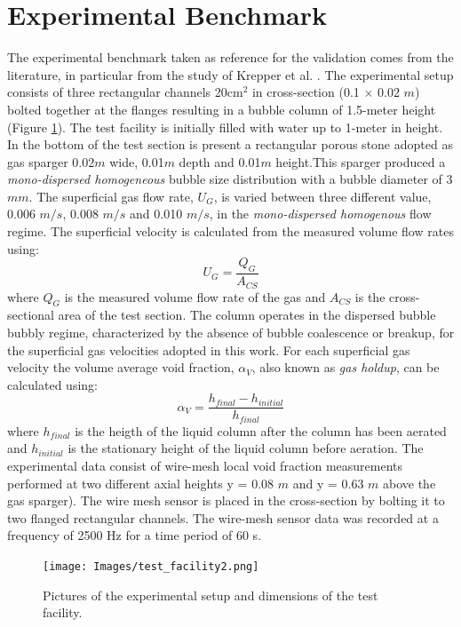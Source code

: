 \documentclass[11pt,a4paper]{article}
\begin{document}
\section{Experimental Benchmark}
\label{sec:expbench}
The  experimental benchmark taken as reference for the validation comes from the literature, in particular from the study of Krepper et al. \cite{krepper}. The experimental setup consists of three rectangular channels 20cm$^2$ in cross-section (0.1 $\times$ 0.02 $m$) bolted together at the flanges resulting in a bubble column of 1.5-meter height (Figure \ref{fig:facility}). The test facility is initially filled with water up to 1-meter in height. In the bottom of the test section is present a rectangular porous stone adopted as gas sparger 0.02$m$ wide, 0.01$m$ depth and 0.01$m$ height.This sparger produced a \textit{mono-dispersed homogeneous} bubble size distribution with a bubble diameter of 3 $mm$. The superficial gas flow rate, $U_G$, is varied between three different value, 0.006 $m/s$, 0.008 $m/s$ and 0.010 $m/s$, in the \textit{mono-dispersed homogenous} flow regime. The superficial velocity is calculated from the measured volume flow rates using: 
\begin{equation}
    U_G=\frac{Q_G}{A_{CS}}
\end{equation}
where $Q_G$ is the measured volume flow rate of the gas and $A_{CS}$ is the cross-sectional area of the test section. The column operates in the dispersed bubble bubbly regime, characterized by the absence of bubble coalescence or breakup, for the superficial gas velocities adopted in this work. For each superficial gas velocity the volume average void fraction, $\alpha_V$, also known as \textit{gas holdup}, can be calculated using: 
\begin{equation}
    \alpha_V=\frac{h_{final}-h_{initial}}{h_{final}}
\end{equation}
where $h_{final}$ is the heigth of the liquid column after the column has been aerated and $h_{initial}$ is the stationary height of the liquid column before aeration. The experimental data consist of wire-mesh local void fraction measurements performed at two different axial heights y = 0.08 $m$ and y = 0.63 $m$ above the gas sparger). The wire mesh sensor is placed in the cross-section by bolting it to two flanged rectangular channels. The wire-mesh sensor data was recorded at a frequency of 2500 Hz for a time period of 60 s. 
\clearpage
\begin{figure}[!ht]
	\centering
	\texttt{[image: Images/test\_facility2.png]}
	\caption{Pictures of the experimental setup and dimensions of the  test facility.}
	\label{fig:facility}
\end{figure}
\end{document}

